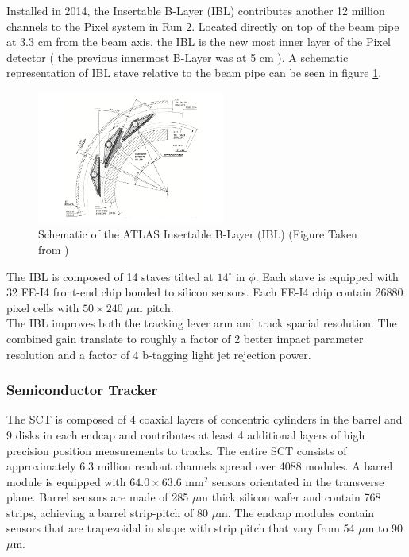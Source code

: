 \indent Installed in 2014, the Insertable B-Layer (IBL) contributes another 12 million channels to the Pixel system in Run 2.\cite{IBLOverview,IBL_TDR}   Located directly on top of the beam pipe at 3.3 cm from the beam axis, the IBL is the new most inner layer of the Pixel detector ( the previous innermost B-Layer was at 5 cm ). A schematic representation of IBL stave relative to the beam pipe can be seen in figure \ref{LHC:fig:IBL}. \\

\begin{figure}[h!]
\centering
\includegraphics[width=0.55\textwidth, angle=0]{figures/LHC_ATLAS/fig_ibl_layout_rev.png}
\caption{ Schematic of the ATLAS Insertable B-Layer (IBL) (Figure Taken from \cite{IBLOverview}) \label{LHC:fig:IBL}}
\end{figure}

\indent The IBL is composed of 14 staves tilted at $14^{\circ}$ in $\phi$.  Each stave is equipped with 32 FE-I4 front-end chip bonded to silicon sensors. Each FE-I4 chip contain 26880 pixel cells with $50 \times 240$ $\mu$m pitch.\\

\indent The IBL improves both the tracking lever arm and track spacial resolution.  The combined gain translate to roughly a factor of 2 better impact parameter resolution and a factor of 4 b-tagging light jet rejection power. \\

\subsubsection*{ Semiconductor Tracker}

\indent The SCT is composed of 4 coaxial layers of concentric cylinders in the barrel and 9 disks in each endcap and contributes at least 4 additional layers of high precision position measurements to tracks.  The entire SCT consists of approximately 6.3 million readout channels spread over 4088 modules.  A barrel module is equipped with $64.0 \times 63.6$ mm$^2$ sensors orientated in the transverse plane.  Barrel sensors are made of 285 $\mu$m thick silicon wafer and contain 768 strips, achieving a barrel strip-pitch of 80 $\mu$m.  The endcap modules contain sensors that are trapezoidal in shape with strip pitch that vary from 54 $\mu$m to 90 $\mu$m.  \\

